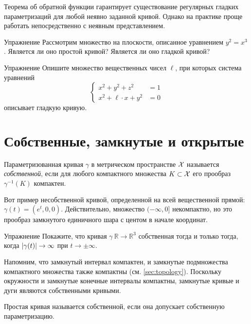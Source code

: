 Теорема об обратной функции гарантирует существование регулярных гладких параметризаций для любой неявно заданной кривой.
Однако на практике проще работать непосредственно с неявным представлением. 

\begin{thm}{Упражнение}\label{ex:y^2=x^3}
Рассмотрим множество на плоскости, описанное уравнением
$y^2=x^3$.
Является ли оно простой кривой?
Является ли оно гладкой кривой?
\end{thm}

\begin{thm}{Упражнение}\label{ex:viviani}
Опишите множество вещественных чисел $\ell$, 
при которых система уравнений
\[\begin{cases}
x^2+y^2+z^2&=1
\\
x^2+\ell\cdot x+y^2&=0
\end{cases}\]
описывает гладкую кривую.
\end{thm}

\section{Собственные, замкнутые и открытые}\label{sec:proper-curves}

{\sloppy

Параметризованная кривая $\gamma$ в метрическом пространстве $\mathcal{X}$ называется \emph{собственной}, если для любого компактного множества $K \z\subset \spc{X}$ его прообраз $\gamma^{-1}(K)$ компактен.

}

Вот пример несобственной кривой, определенной на всей вещественной прямой: $\gamma(t)=(e^t,0,0)$.
Действительно, множество $(-\infty,0]$ некомпактно, но это прообраз замкнутого единичного шара с центом в начале координат.

\begin{thm}{Упражнение}\label{ex:open-curve}
Покажите, что кривая $\gamma\:\mathbb{R}\to\mathbb{R}^3$ собственная тогда и только тогда, когда $|\gamma(t)|\z\to\infty$ при $t\to\pm\infty$.
\end{thm}

Напомним, что замкнутый интервал компактен, и замкнутые подмножества компактного множества также компактны
(см. \ref{sec:topology}).
Поскольку окружности и замкнутые конечные интервалы компактны, замкнутые кривые и дуги являются собственными кривыми.

Простая кривая называется собственной, если она допускает собственную параметризацию.

